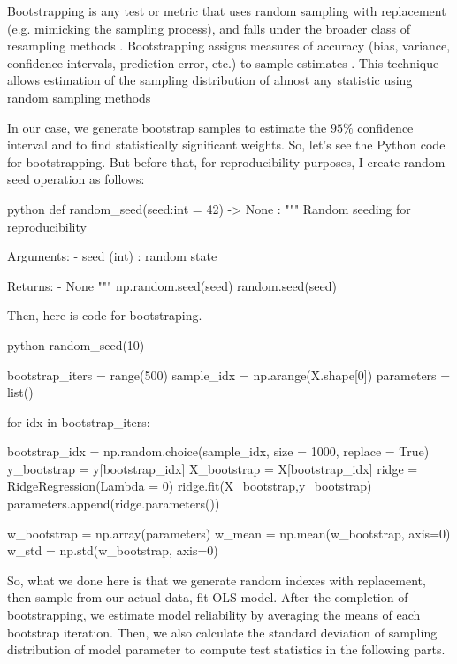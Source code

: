 \documentclass[12pt]{amsart}
\begin{document}
\bigskip

Bootstrapping is any test or metric that uses random sampling with replacement (e.g. mimicking the sampling process), and falls under the broader class of resampling methods \cite{enwiki:1014701581}. Bootstrapping assigns measures of accuracy (bias, variance, confidence intervals, prediction error, etc.) to sample estimates \cite{enwiki:1014701581}. This technique allows estimation of the sampling distribution of almost any statistic using random sampling methods \cite{enwiki:1014701581}

In our case, we generate bootstrap samples to estimate the $95\%$ confidence interval and to find statistically significant weights. So, let's see the Python code for bootstrapping. But before that, for reproducibility purposes, I create random seed operation as follows:

\begin{mintedbox}{python}
def random_seed(seed:int = 42) -> None :
    """ Random seeding for reproducibility 
    
            Arguments:
                - seed (int) : random state

            Returns:
                - None
    """
    np.random.seed(seed)
    random.seed(seed)
\end{mintedbox}

Then, here is code for bootstraping.
\begin{mintedbox}{python}
random_seed(10)

bootstrap_iters = range(500)
sample_idx = np.arange(X.shape[0])
parameters = list()

for idx in bootstrap_iters:

    bootstrap_idx = np.random.choice(sample_idx, size = 1000, replace = True)
    y_bootstrap = y[bootstrap_idx]
    X_bootstrap = X[bootstrap_idx]
    ridge = RidgeRegression(Lambda = 0)
    ridge.fit(X_bootstrap,y_bootstrap)
    parameters.append(ridge.parameters()) 
    
w_bootstrap = np.array(parameters)
w_mean = np.mean(w_bootstrap, axis=0)
w_std = np.std(w_bootstrap, axis=0)
\end{mintedbox}


So, what we done here is that we generate random indexes with replacement, then sample from our actual data, fit OLS model. After the completion of bootstrapping, we estimate model reliability by averaging the means of each bootstrap iteration. Then, we also calculate the standard deviation of sampling distribution of model parameter to compute test statistics in the following parts.
\end{document}
